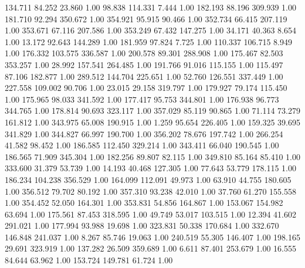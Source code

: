  134.711   84.252   23.860         1.00
  98.838  114.331    7.444         1.00
 182.193   88.196  309.939         1.00
 181.710   92.294  350.672         1.00
 354.921   95.915   90.466         1.00
 352.734   66.415  207.119         1.00
 353.671   67.116  207.586         1.00
 353.249   67.432  147.275         1.00
  34.171   40.363    8.654         1.00
  13.172   92.643  144.289         1.00
 181.959   97.824    7.725         1.00
 110.337  106.715    8.949         1.00
 176.332  103.575  336.587         1.00
 200.578   89.301  288.908         1.00
 175.467   82.503  353.257         1.00
  28.992  157.541  264.485         1.00
 191.766   91.016  115.155         1.00
 115.497   87.106  182.877         1.00
 289.512  144.704  225.651         1.00
  52.760  126.551  337.449         1.00
 227.558  109.002   90.706         1.00
  23.015   29.158  319.797         1.00
 179.927   79.174  115.450         1.00
 175.965   98.033  341.592         1.00
 177.417   95.753  344.801         1.00
 176.938   96.773  344.765         1.00
 178.814   90.693  323.117         1.00
 357.029   85.119   90.865         1.00
  71.114   73.279  161.812         1.00
 343.975   65.008  190.915         1.00
   1.259   95.654  226.405         1.00
 159.325   39.695  341.829         1.00
 344.827   66.997  190.700         1.00
 356.202   78.676  197.742         1.00
 266.254   41.582   98.452         1.00
 186.585  112.450  329.214         1.00
 343.411   66.040  190.545         1.00
 186.565   71.909  345.304         1.00
 182.256   89.807   82.115         1.00
 349.810   85.164   85.410         1.00
 333.600   31.379   53.739         1.00
  14.193   40.468  127.305         1.00
  77.643   53.779  178.115         1.00
 186.234  104.238  356.529         1.00
 164.099  112.091   49.973         1.00
  63.910   44.755  180.605         1.00
 356.512   79.702   80.192         1.00
 357.310   93.238   42.010         1.00
  37.760   61.270  155.558         1.00
 354.452   52.050  164.301         1.00
 353.831   54.856  164.867         1.00
 153.067  154.982   63.694         1.00
 175.561   87.453  318.595         1.00
  49.749   53.017  103.515         1.00
  12.394   41.602  291.021         1.00
 177.994   93.988   19.698         1.00
 323.831   50.338  170.684         1.00
 332.670  146.848  241.037         1.00
   8.267   85.746   19.063         1.00
 240.519   55.305  146.407         1.00
 198.165   29.691  323.919         1.00
 137.282   26.509  359.689         1.00
   6.611   87.401  253.679         1.00
  16.555   84.644   63.962         1.00
 153.724  149.781   61.724         1.00
